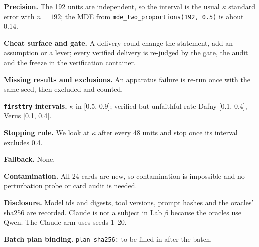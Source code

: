 \documentclass[11pt]{article}
\begin{document}
\begin{answer}
\textbf{Precision.} The 192 units are independent, so the interval is the
usual $\kappa$ standard error with $n = 192$; the MDE from
\texttt{mde\_two\_proportions(192, 0.5)} is about 0.14.

\textbf{Cheat surface and gate.} A delivery could change the statement, add an
assumption or a lever; every verified delivery is re-judged by the gate, the
audit and the freeze in the verification container.

\textbf{Missing results and exclusions.} An apparatus failure is re-run once
with the same seed, then excluded and counted.

\textbf{\texttt{firsttry} intervals.} $\kappa$ in [0.5, 0.9]; verified-but-unfaithful
rate Dafny [0.1, 0.4], Verus [0.1, 0.4].

\textbf{Stopping rule.} We look at $\kappa$ after every 48 units and stop once
its interval excludes 0.4.

\textbf{Fallback.} None.

\textbf{Contamination.} All 24 cards are new, so contamination is impossible
and no perturbation probe or card audit is needed.

\textbf{Disclosure.} Model ids and digests, tool versions, prompt hashes and the
oracles' sha256 are recorded. Claude is not a
subject in Lab $\beta$ because the oracles use Qwen. The Claude arm uses seeds
1--20.

\textbf{Batch plan binding.} \texttt{plan-sha256:} to be filled in after the
batch.
\end{answer}
\end{document}
